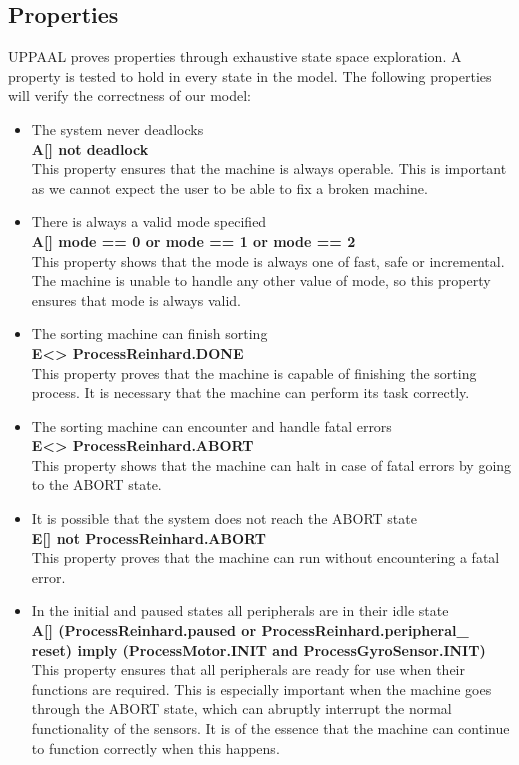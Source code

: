 \documentclass[a4paper,oneside,11pt]{article}
\begin{document}
\subsection{Properties}
UPPAAL proves properties through exhaustive state space exploration. A property is tested to hold in every state in the model. The following properties will verify the correctness of our model:
\begin{itemize}
	\item The system never deadlocks\\
		\textbf{A[] not deadlock}\\
		This property ensures that the machine is always operable. This is important as we cannot expect the user to be able to fix a broken machine.
	\item There is always a valid mode specified\\
		\textbf{A[] mode == 0 or mode == 1 or mode == 2}\\
		This property shows that the mode is always one of fast, safe or incremental. The machine is unable to handle any other value of mode, so this property ensures that mode is always valid.
	\item The sorting machine can finish sorting\\
		\textbf{E<> ProcessReinhard.DONE}\\
	This property proves that the machine is capable of finishing the sorting process. It is necessary that the machine can perform its task correctly.
	\item The sorting machine can encounter and handle fatal errors\\
		\textbf{E<> ProcessReinhard.ABORT}\\
		This property shows that the machine can halt in case of fatal errors by going to the ABORT state.
	\item It is possible that the system does not reach the ABORT state\\
		\textbf{E[] not ProcessReinhard.ABORT}\\
		This property proves that the machine can run without encountering a fatal error. 
	\item In the initial and paused states all peripherals are in their idle state\\
		\textbf{A[] (ProcessReinhard.paused or ProcessReinhard.peripheral\_ reset) imply (ProcessMotor.INIT and ProcessGyroSensor.INIT)}\\
		This property ensures that all peripherals are ready for use when their functions are required. This is especially important when the machine goes through the ABORT state, which can abruptly interrupt the normal functionality of the sensors. It is of the essence that the machine can continue to function correctly when this happens.


\end{itemize}
\end{document}
